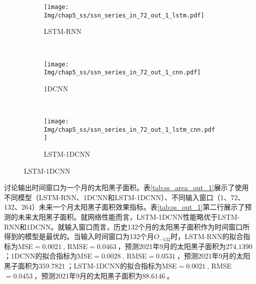 \begin{figure}[!htbp]
  \centering
  \begin{subfigure}[b]{1.0\textwidth}
    \caption{LSTM-RNN} 
    \vspace{-0.35cm}
    \texttt{[image: Img/chap5\_ss/ssn\_series\_in\_72\_out\_1\_lstm.pdf]}
    \label{fig:ssn_series_in_72_out_1_lstm}
  \end{subfigure}    \\
  \vspace{-1cm}
  \begin{subfigure}[b]{1.0\textwidth}
    \caption{1DCNN}
    \vspace{-0.35cm}
    \texttt{[image: Img/chap5\_ss/ssn\_series\_in\_72\_out\_1\_cnn.pdf]}
    \label{fig:ssn_series_in_72_out_1_cnn}
  \end{subfigure} \\
  \vspace{-1cm}
  \begin{subfigure}[b]{1.0\textwidth}
    \caption{LSTM-1DCNN}
    \vspace{-0.35cm}
    \texttt{[image: Img/chap5\_ss/ssn\_series\_in\_72\_out\_1\_lstm\_cnn.pdf]}
    \label{fig:ssn_series_in_72_out_1_lstm_cnn}
    \end{subfigure}
  \vspace{-2cm}
  \label{fig:ssn_series_in_72_out_1}
\end{figure}

讨论输出时间窗口为一个月的太阳黑子面积。表\ref{tab:ss_area_out_1}展示了使用不同模型（LSTM-RNN、1DCNN和LSTM-1DCNN）、不同输入窗口（1、72、132、264）未来一个月太阳黑子面积效果指标。表\ref{tab:ss_out_1}第二行展示了预测的未来太阳黑子面积。就网络性能而言，LSTM-1DCNN性能略优于LSTM-RNN和1DCNN。就输入窗口而言，历史132个月的太阳黑子面积作为时间窗口所得到的模型是最优的。当输入时间窗口为132个月$O_{-132}$时，LSTM-RNN的拟合指标为MSE$=\SI{0.0021}{}$, RMSE$=\SI{0.0463}{}$，预测2021年9月的太阳黑子面积为$\SI{274.1390}{}$；1DCNN的拟合指标为MSE$=\SI{0.0028}{}$, RMSE$=\SI{0.0531}{}$，预测2021年9月的太阳黑子面积为$\SI{359.7821}{}$；LSTM-1DCNN的拟合指标为MSE$=\SI{0.0021}{}$, RMSE$=\SI{0.0453}{}$，预测2021年9月的太阳黑子面积为$\SI{88.6146}{}$。

